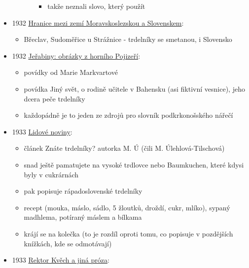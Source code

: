 \begin{itemize}
\begin{itemize}
\begin{itemize}
      \begin{itemize}
      \tightlist
      \item
        takže neznali slovo, který použít
      \end{itemize}
    \end{itemize}
  \end{itemize}
\item
  1932
  \href{https://ceskadigitalniknihovna.cz/view/uuid:60ab056c-5ee1-43ab-9014-e91189880750?page=uuid\%3A31d79ba8-8100-11ed-8b6a-001b63bd97ba&fulltext=trd*&source=kfbz}{Hranice
  mezi zemí Moravskoslezskou a Slovenskem}:

  \begin{itemize}
  \tightlist
  \item
    Břeclav, Sudoměřice u Strážnice - trdelníky se smetanou, i Slovensko
  \end{itemize}
\item
  1932
  \href{https://www.digitalniknihovna.cz/mzk/view/uuid:ea5d2d20-0652-11e8-b1a1-005056827e52?page=uuid\%3A58510a10-3f36-11e8-a7aa-005056825209&fulltext=trdeln\%C3\%ADk}{Jeřabiny:
  obrázky z horního Pojizeří}:

  \begin{itemize}
  \tightlist
  \item
    povídky od Marie Markvartové
  \item
    povídka Jiný svět, o rodině učitele v Bahensku (asi fiktivní
    vesnice), jeho dcera peče trdelníky
  \item
    každopádně je to jeden ze zdrojů pro slovník podkrkonošského nářečí
  \end{itemize}
\item
  1933
  \href{https://ceskadigitalniknihovna.cz/view/uuid:1026bc40-ea8b-11dc-9dcb-000d606f5dc6?page=uuid\%3Ac347cf40-31ff-4912-b767-a8cb9e4e8683&fulltext=trdeln*&source=nkp}{Lidové
  noviny}:

  \begin{itemize}
  \tightlist
  \item
    článek Znáte trdelníky? autorka M. Ú (čili M. Úlehlová-Tilschová)
  \item
    snad ještě pamatujete na vysoké trdlovce nebo Baumkuchen, které
    kdysi byly v cukrárnách
  \item
    pak popisuje rápadoslovenské trdelníky
  \item
    recept (mouka, máslo, sádlo, 5 žloutků, droždí, cukr, mlíko), sypaný
    madhlema, potíraný máslem a bílkama
  \item
    krájí se na kolečka (to je rozdíl oproti tomu, co popisuje v
    pozdějších knížkách, kde se odmotávají)
  \end{itemize}
\item
  1933
  \href{https://ceskadigitalniknihovna.cz/view/uuid:60eab9a0-0be7-11ed-8635-005056827e52?page=uuid\%3A8ee6bb86-db3e-4211-a60a-d927a201dc69&fulltext=trdeln*&source=mzk}{Rektor
  Kvěch a jiná próza}:


\end{itemize}
